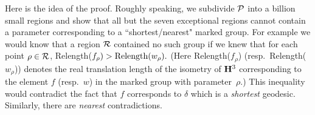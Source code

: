 Here is the idea of the proof.
Roughly speaking, we subdivide ${\cal P}$ into a billion small regions and 
show that all but the seven exceptional regions cannot contain 
a parameter corresponding to a  
``shortest/nearest" marked group.
For example we would know that 
a region ${\cal R}$ contained no such group if we knew that for each 
point $\rho\in {\cal R}$,
Relength($f_\rho) > {\rm Relength}(w_\rho).$  
(Here Relength($f_\rho$) (resp.\ Relength($w_\rho^{\phantom{|}}$))
denotes the real translation length of the isometry of ${\bf H}^3$ 
corresponding to
the element $f$ (resp.\ $w$) in the marked group with parameter~$\rho.$)
This inequality would contradict the fact that $f$ corresponds to $\delta$ 
which is a {\it shortest} geodesic.  Similarly, there are {\it nearest}
contradictions.

